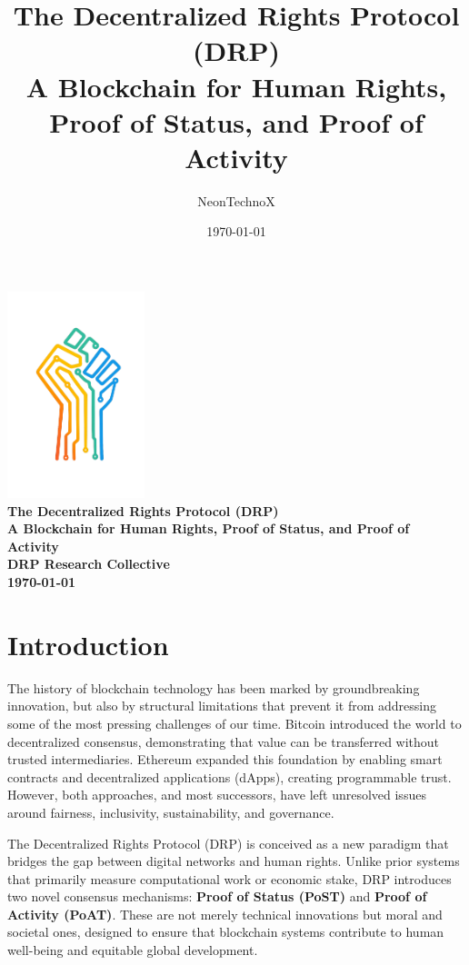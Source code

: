 \documentclass[11pt,a4paper]{article}
\title{\textbf{The Decentralized Rights Protocol (DRP)} \\ 
\large A Blockchain for Human Rights, Proof of Status, and Proof of Activity}
\author{NeonTechnoX}
\date{\today}
\begin{document}
\begin{titlepage}
\begin{center}
\vspace{3cm}
\includegraphics[width=0.3\textwidth]{DRP.png}\\[1cm]
\LARGE\bfseries
\textbf{The Decentralized Rights Protocol (DRP)} \\[0.5cm]
\large A Blockchain for Human Rights, Proof of Status, and Proof of Activity\\[2cm]
\large DRP Research Collective\\[1cm]
\today
\end{center}
\end{titlepage}

\newpage
\tableofcontents
\thispagestyle{empty}

\newpage


\section{Introduction}

The history of blockchain technology has been marked by groundbreaking innovation, but also by structural limitations that prevent it from addressing some of the most pressing challenges of our time. Bitcoin introduced the world to decentralized consensus, demonstrating that value can be transferred without trusted intermediaries. Ethereum expanded this foundation by enabling smart contracts and decentralized applications (dApps), creating programmable trust. However, both approaches, and most successors, have left unresolved issues around fairness, inclusivity, sustainability, and governance.

The Decentralized Rights Protocol (DRP) is conceived as a new paradigm that bridges the gap between digital networks and human rights. Unlike prior systems that primarily measure computational work or economic stake, DRP introduces two novel consensus mechanisms: \textbf{Proof of Status (PoST)} and \textbf{Proof of Activity (PoAT)}. These are not merely technical innovations but moral and societal ones, designed to ensure that blockchain systems contribute to human well-being and equitable global development.
\end{document}
